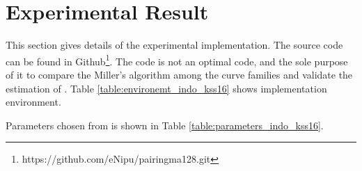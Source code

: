 \section{Experimental Result}
This section gives details of the experimental implementation. The source code can be found in Github\footnote{\label{source_code_indo}https://github.com/eNipu/pairingma128.git}. 
The code is not an optimal code, and the sole purpose of it to compare the Miller's algorithm among the curve families and validate the estimation of \cite{EPRINT:BarDuq17}.
Table \ref{table:environemt_indo_kss16} shows implementation environment.  
\renewcommand{\baselinestretch}{1.5}
\begin{table}[ht]
	\centering
	\caption{Computational environment.}
	\label{table:environemt_indo_kss16}
\end{table}
\renewcommand{\baselinestretch}{1.0}
Parameters chosen from \cite{EPRINT:BarDuq17} is shown in Table \ref{table:parameters_indo_kss16}.
\renewcommand{\baselinestretch}{1.5}
\begin{table}[ht]
	\caption{Selected parameters for 128-bit security level \cite{EPRINT:BarDuq17}.}
	\label{table:parameters_indo_kss16}
	\begin{center}         
	\end{center}
\end{table}
